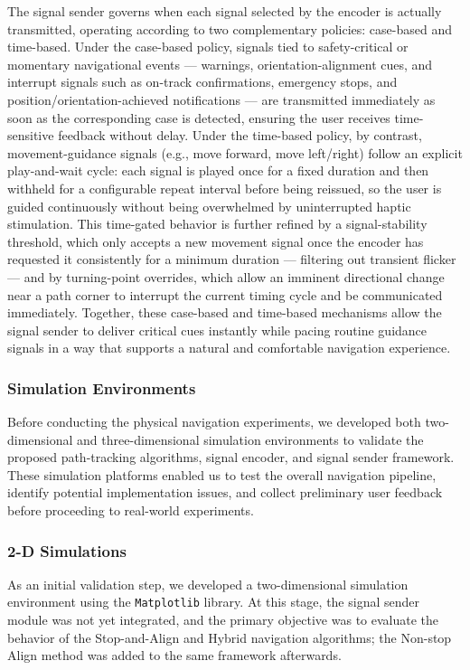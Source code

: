 \documentclass[12pt]{report}
\begin{document}
The signal sender governs when each signal selected by the encoder is actually transmitted, operating according to two complementary policies: case-based and time-based. Under the case-based policy, signals tied to safety-critical or momentary navigational events --- warnings, orientation-alignment cues, and interrupt signals such as on-track confirmations, emergency stops, and position/orientation-achieved notifications --- are transmitted immediately as soon as the corresponding case is detected, ensuring the user receives time-sensitive feedback without delay. Under the time-based policy, by contrast, movement-guidance signals (e.g., move forward, move left/right) follow an explicit play-and-wait cycle: each signal is played once for a fixed duration and then withheld for a configurable repeat interval before being reissued, so the user is guided continuously without being overwhelmed by uninterrupted haptic stimulation. This time-gated behavior is further refined by a signal-stability threshold, which only accepts a new movement signal once the encoder has requested it consistently for a minimum duration --- filtering out transient flicker --- and by turning-point overrides, which allow an imminent directional change near a path corner to interrupt the current timing cycle and be communicated immediately. Together, these case-based and time-based mechanisms allow the signal sender to deliver critical cues instantly while pacing routine guidance signals in a way that supports a natural and comfortable navigation experience.

\subsubsection{Simulation Environments}

Before conducting the physical navigation experiments, we developed both two-dimensional and three-dimensional simulation environments to validate the proposed path-tracking algorithms, signal encoder, and signal sender framework. These simulation platforms enabled us to test the overall navigation pipeline, identify potential implementation issues, and collect preliminary user feedback before proceeding to real-world experiments.

\subsubsection*{2-D Simulations}

As an initial validation step, we developed a two-dimensional simulation environment using the \texttt{Matplotlib} library. At this stage, the signal sender module was not yet integrated, and the primary objective was to evaluate the behavior of the Stop-and-Align and Hybrid navigation algorithms; the Non-stop Align method was added to the same framework afterwards.
\end{document}

